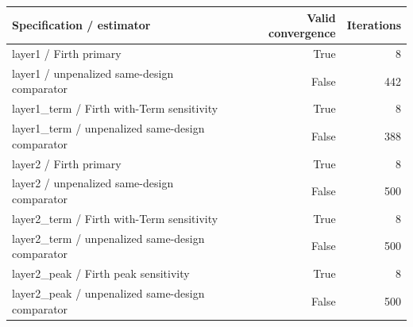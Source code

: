 \begingroup\small\setlength{\tabcolsep}{3pt}
\begin{tabularx}{\linewidth}{Xrr}\toprule
Specification / estimator & Valid convergence & Iterations \\ \midrule
layer1 / Firth primary & True & 8 \\
layer1 / unpenalized same-design comparator & False & 442 \\
layer1\_term / Firth with-Term sensitivity & True & 8 \\
layer1\_term / unpenalized same-design comparator & False & 388 \\
layer2 / Firth primary & True & 8 \\
layer2 / unpenalized same-design comparator & False & 500 \\
layer2\_term / Firth with-Term sensitivity & True & 8 \\
layer2\_term / unpenalized same-design comparator & False & 500 \\
layer2\_peak / Firth peak sensitivity & True & 8 \\
layer2\_peak / unpenalized same-design comparator & False & 500 \\
\bottomrule\end{tabularx}\endgroup
